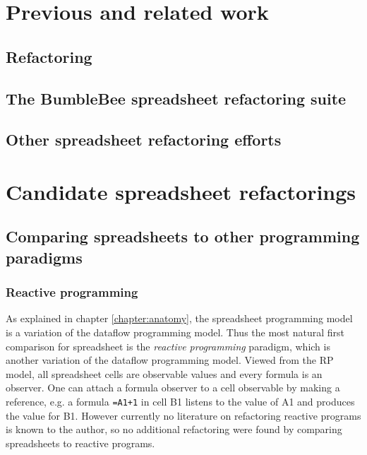 \documentclass[12pt,a4paper,onecolumn,oneside]{memoir}
\newcommand{\f}[1]{\texttt{#1}}
\begin{document}


\chapter{Previous and related work}
\label{chapter:previouswork}

\section{Refactoring}

\section{The BumbleBee spreadsheet refactoring suite}

\section{Other spreadsheet refactoring efforts}


\chapter{Candidate spreadsheet refactorings}
\label{chapter:candidaterefactorings}

\section{Comparing spreadsheets to other programming paradigms}

\subsection{Reactive programming}
As explained in chapter \ref{chapter:anatomy}, the spreadsheet programming model is a variation of the dataflow programming model.
Thus the most natural first comparison for spreadsheet is the \emph{reactive programming} paradigm, which is another variation of the dataflow programming model.
Viewed from the RP model, all spreadsheet cells are observable values and every formula is an observer.
One can attach a formula observer to a cell observable by making a reference, e.g. a formula \f{=A1+1} in cell B1 listens to the value of A1 and produces the value for B1.
However currently no literature on refactoring reactive programs is known to the author, so no additional refactoring were found by comparing spreadsheets to reactive programs.
\end{document}

